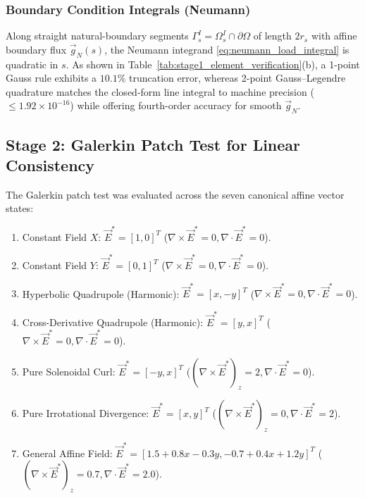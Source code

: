 \documentclass[VANCOUVER]{USG}
\begin{document}
\subsubsection{Boundary Condition Integrals (Neumann)}
Along straight natural-boundary segments $\Gamma_s^I = \Omega_s^I \cap \partial\Omega$ of length $2r_s$ with affine boundary flux $\vec{g}_N(s)$, the Neumann integrand \eqref{eq:neumann_load_integral} is quadratic in $s$. As shown in Table~\ref{tab:stage1_element_verification}(b), a 1-point Gauss rule exhibits a $10.1\%$ truncation error, whereas 2-point Gauss--Legendre quadrature matches the closed-form line integral to machine precision ($\le 1.92 \times 10^{-16}$) while offering fourth-order accuracy for smooth $\vec{g}_N$.

\subsection{Stage 2: Galerkin Patch Test for Linear Consistency}
\label{subsec:stage2_patch_test}

The Galerkin patch test was evaluated across the seven canonical affine vector states:
\begin{enumerate}
    \item Constant Field $X$: $\vec{E}^* = [1, 0]^T$ ($\nabla \times \vec{E}^* = 0, \nabla \cdot \vec{E}^* = 0$).
    \item Constant Field $Y$: $\vec{E}^* = [0, 1]^T$ ($\nabla \times \vec{E}^* = 0, \nabla \cdot \vec{E}^* = 0$).
    \item Hyperbolic Quadrupole (Harmonic): $\vec{E}^* = [x, -y]^T$ ($\nabla \times \vec{E}^* = 0, \nabla \cdot \vec{E}^* = 0$).
    \item Cross-Derivative Quadrupole (Harmonic): $\vec{E}^* = [y, x]^T$ ($\nabla \times \vec{E}^* = 0, \nabla \cdot \vec{E}^* = 0$).
    \item Pure Solenoidal Curl: $\vec{E}^* = [-y, x]^T$ ($(\nabla \times \vec{E}^*)_z = 2, \nabla \cdot \vec{E}^* = 0$).
    \item Pure Irrotational Divergence: $\vec{E}^* = [x, y]^T$ ($(\nabla \times \vec{E}^*)_z = 0, \nabla \cdot \vec{E}^* = 2$).
    \item General Affine Field: $\vec{E}^* = [1.5 + 0.8x - 0.3y, -0.7 + 0.4x + 1.2y]^T$ ($(\nabla \times \vec{E}^*)_z = 0.7, \nabla \cdot \vec{E}^* = 2.0$).
\end{enumerate}
\end{document}
